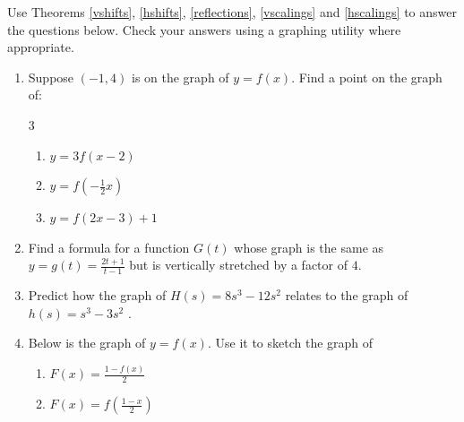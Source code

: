 \documentclass{ximera}
\begin{document}
\begin{example}  \label{scalingsex} 


Use Theorems  \ref{vshifts},  \ref{hshifts}, \ref{reflections}, \ref{vscalings} and \ref{hscalings}  to answer the questions below.  Check your answers using a graphing utility where appropriate.
 
 \begin{enumerate}
 
 \item   Suppose $(-1,4)$ is on the graph of $y = f(x)$.  Find a point on the graph of:
 
 \begin{multicols}{3}
 
 \begin{enumerate}
 
 \item $y = 3f(x-2)$
 
 \item $y = f\left(-\frac{1}{2} x \right)$
 
 \item  $y = f(2x-3)+1$
 
 \end{enumerate}
 
 \end{multicols}
 
 \item  Find a formula for a function $G(t)$ whose graph is the same as $y=g(t) = \frac{2t+1}{t-1}$ but is vertically stretched by a factor of $4$.
  
 \item Predict how the graph of $H(s) = 8s^3 - 12s^2$ relates to the graph of $h(s) = s^3-3s^2$ . 
 
\item  Below is the graph of $y = f(x)$.  Use it to sketch the graph of

 
 \begin{enumerate}
 
 \item $F(x) = \frac{1-f(x)}{2}$
 
  \item  $F(x)= f\left( \frac{1-x}{2} \right)$
 
 \end{enumerate}
 

 \begin{center}
 \end{center}


\end{enumerate}
\end{example}
\end{document}
